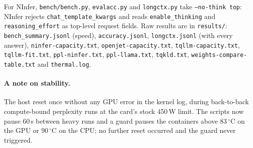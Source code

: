 \noindent For NInfer, \texttt{bench/bench.py}, \texttt{evalacc.py} and \texttt{longctx.py} take
\texttt{--no-think top}: NInfer rejects \texttt{chat\_template\_kwargs} and reads
\texttt{enable\_thinking} and \texttt{reasoning\_effort} as top-level request fields.
Raw results are in \texttt{results/}: \texttt{bench\_summary.jsonl} (speed),
\texttt{accuracy.jsonl}, \texttt{longctx.jsonl} (with every answer),
\texttt{ninfer-capacity.txt}, \texttt{openjet-capacity.txt}, \texttt{tqllm-capacity.txt},
\texttt{tqllm-fit.txt}, \texttt{ppl-ninfer.txt}, \texttt{ppl-llama.txt}, \texttt{tqkld.txt},
\texttt{weights-compare-table.txt} and \texttt{thermal.log}.

\paragraph{A note on stability.} The host reset once without any GPU error in the kernel log,
during back-to-back compute-bound perplexity runs at the card's stock 450\,W limit. The scripts
now pause 60\,s between heavy runs and a guard pauses the containers above 83\,$^\circ$C on the
GPU or 90\,$^\circ$C on the CPU; no further reset occurred and the guard never triggered.
